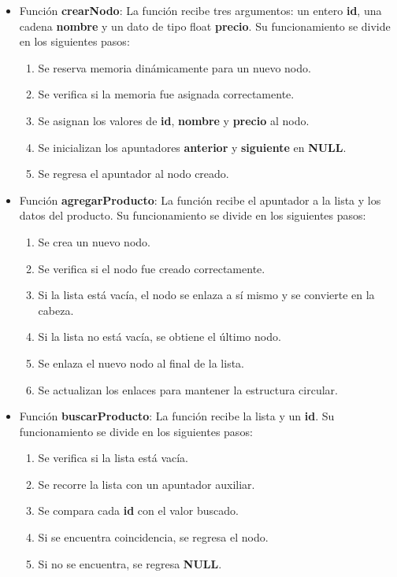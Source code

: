 \documentclass[letterpaper,12pt,oneside]{article}
\begin{document}
\begin{itemize}

\item Función \textbf{crearNodo}: La función recibe tres argumentos: un entero \textbf{id}, una cadena \textbf{nombre} y un dato de tipo float \textbf{precio}. Su funcionamiento se divide en los siguientes pasos:
\begin{enumerate}
    \item Se reserva memoria dinámicamente para un nuevo nodo.
    \item Se verifica si la memoria fue asignada correctamente.
    \item Se asignan los valores de \textbf{id}, \textbf{nombre} y \textbf{precio} al nodo.
    \item Se inicializan los apuntadores \textbf{anterior} y \textbf{siguiente} en \textbf{NULL}.
    \item Se regresa el apuntador al nodo creado.
\end{enumerate}

\item Función \textbf{agregarProducto}: La función recibe el apuntador a la lista y los datos del producto. Su funcionamiento se divide en los siguientes pasos:
\begin{enumerate}
    \item Se crea un nuevo nodo.
    \item Se verifica si el nodo fue creado correctamente.
    \item Si la lista está vacía, el nodo se enlaza a sí mismo y se convierte en la cabeza.
    \item Si la lista no está vacía, se obtiene el último nodo.
    \item Se enlaza el nuevo nodo al final de la lista.
    \item Se actualizan los enlaces para mantener la estructura circular.
\end{enumerate}

\item Función \textbf{buscarProducto}: La función recibe la lista y un \textbf{id}. Su funcionamiento se divide en los siguientes pasos:
\begin{enumerate}
    \item Se verifica si la lista está vacía.
    \item Se recorre la lista con un apuntador auxiliar.
    \item Se compara cada \textbf{id} con el valor buscado.
    \item Si se encuentra coincidencia, se regresa el nodo.
    \item Si no se encuentra, se regresa \textbf{NULL}.
\end{enumerate}


\end{itemize}
\end{document}
